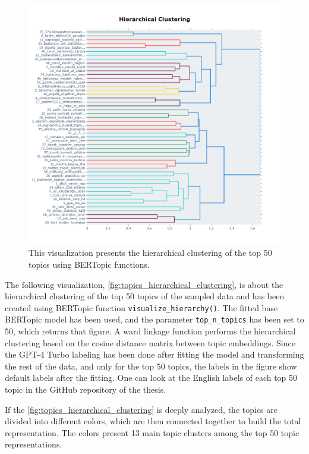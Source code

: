 \begin{figure}[h!]
    \centering
    \includegraphics[width=\linewidth]{figures/Hierarchical_Clustering.png}
    \caption[Hierarchical Clustering of the Top 50 Topics]
    {This visualization presents the hierarchical clustering of the top 50 topics 
    using BERTopic functions.}\label{fig:topics_hierarchical_clustering}
\end{figure}

The following visualization, \autoref{fig:topics_hierarchical_clustering}, is about the hierarchical 
clustering of the top 50 topics of the sampled data and has been created using BERTopic 
function \texttt{visualize\_hierarchy()}. The fitted base BERTopic model has been used, and the 
parameter \texttt{top\_n\_topics} has been set to 50, which returns that figure. A ward linkage 
function performs the hierarchical clustering based on the cosine distance matrix between topic 
embeddings. Since the GPT-4 Turbo labeling has been done after fitting the model and transforming the rest of the data, 
and only for the top 50 topics, the labels in the figure show default labels after the fitting. 
One can look at the English labels of each top 50 topic in the GitHub repository of the thesis.

If the \autoref{fig:topics_hierarchical_clustering} is deeply analyzed, the topics are divided 
into different colors, which are then connected together to build the total representation. 
The colors present 13 main topic clusters among the top 50 topic representations.

